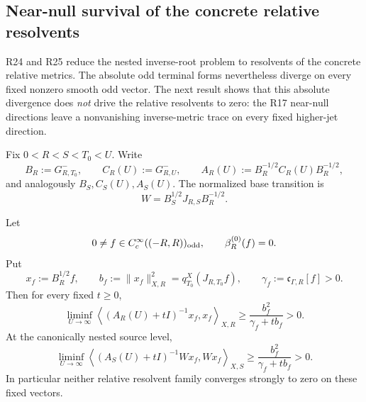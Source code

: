 
\subsection{Near-null survival of the concrete relative resolvents}
\label{subsec:o3y-nearnull-resolvent}

R24 and R25 reduce the nested inverse-root problem to resolvents of the concrete
relative metrics.  The absolute odd terminal forms nevertheless diverge on every fixed
nonzero smooth odd vector.  The next result shows that this absolute divergence does
\emph{not} drive the relative resolvents to zero: the R17 near-null directions leave a
nonvanishing inverse-metric trace on every fixed higher-jet direction.

Fix $0<R<S<T_0<U$.  Write
\[
 B_R:=G_{R,T_0}^-,
 \qquad
 C_R(U):=G_{R,U}^-,
 \qquad
 A_R(U):=B_R^{-1/2}C_R(U)B_R^{-1/2},
\tag{O3Y.1}\label{eq:o3y-relative-R}
\]
and analogously $B_S,C_S(U),A_S(U)$.  The normalized base transition is
\[
 W=B_S^{1/2}J_{R,S}B_R^{-1/2}.
\]

\begin{theorem}
\label{thm:o3y-resolvent-survival}
Let
\[
 0\ne f\in C_c^\infty((-R,R))_{\rm odd},
 \qquad
 \beta_R^{(0)}(f)=0.
\]
Put
\[
 x_f:=B_R^{1/2}f,
 \qquad
 b_f:=\|x_f\|_{X,R}^2
 =q_{T_0}^X(J_{R,T_0}f),
 \qquad
 \gamma_f:=\mathfrak c_{\Gamma,R}[f]>0.
\]
Then for every fixed $t\ge0$,
\[
 \boxed{
 \liminf_{U\to\infty}
 \left\langle(A_R(U)+tI)^{-1}x_f,x_f\right\rangle_{X,R}
 \ge
 \frac{b_f^2}{\gamma_f+t b_f}>0.
 }
\tag{O3Y.2}\label{eq:o3y-R-resolvent-lower}
\]
At the canonically nested source level,
\[
 \boxed{
 \liminf_{U\to\infty}
 \left\langle(A_S(U)+tI)^{-1}Wx_f,Wx_f\right\rangle_{X,S}
 \ge
 \frac{b_f^2}{\gamma_f+t b_f}>0.
 }
\tag{O3Y.3}\label{eq:o3y-S-resolvent-lower}
\]
In particular neither relative resolvent family converges strongly to zero on these
fixed vectors.
\end{theorem}


